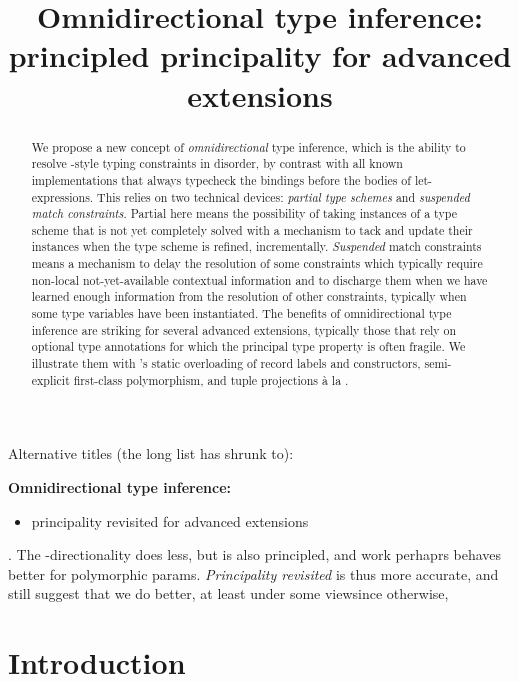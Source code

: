 \documentclass[acmsmall,screen,nonacm]{acmart}
\title{Omnidirectional type inference:
  principled principality for advanced \ML extensions
}
\begin{document}
\begin{abstract}
We propose a new concept of \emph{omnidirectional} type inference, which is
the ability to resolve \ML-style typing constraints in disorder, by
contrast with all known implementations that always typecheck the
bindings before the bodies of let-expressions.
%
This relies on two technical devices: \emph{partial type schemes}
and \emph{suspended match constraints}. Partial here means  the
possibility of taking instances of a type scheme that is not yet
completely solved with a mechanism to tack and update their instances when
the type scheme is refined, incrementally.
\emph{Suspended} match constraints means a mechanism to delay the resolution of
some constraints which typically require non-local not-yet-available
contextual information and to  discharge them when we have learned enough
information from the resolution of other constraints, typically when some type
variables have been instantiated.
%
The benefits of omnidirectional type inference are striking for several
advanced \ML extensions, typically those that rely on optional type
annotations for which the principal type property is often fragile.  We
illustrate them with \OCaml's static overloading of record labels and
constructors, semi-explicit first-class polymorphism, and tuple projections
\`a la \SML.
\end{abstract}
\maketitle

\begin{version}[Titles]{\blue\True}
Alternative titles (the long list has shrunk to):

\medskip
\noindent \textbf{Omnidirectional type inference:}
\begin{itemize}
\item principality revisited for advanced \ML extensions
\end{itemize}
. The \Geninst-directionality does less,
but is also principled, and work perhaprs behaves better for polymorphic
params. \emph{Principality revisited} is thus more accurate, and still
suggest that we do better, at least under some viewsince otherwise,
\end{version}

\section{Introduction}
\label{sec/introduction}
\end{document}
